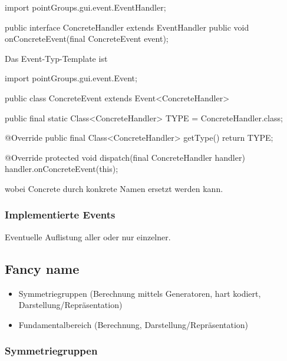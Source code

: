             \begin{code}
                import pointGroups.gui.event.EventHandler;

                public interface ConcreteHandler
                    extends EventHandler
                {
                    public void onConcreteEvent(final ConcreteEvent event);
                }
            \end{code}

            Das Event-Typ-Template ist

            \begin{code}            
                import pointGroups.gui.event.Event;

                public class ConcreteEvent
                    extends Event<ConcreteHandler>
                {
                    public final static Class<ConcreteHandler> TYPE =
                        ConcreteHandler.class;

                    @Override
                    public final Class<ConcreteHandler> getType() {
                        return TYPE;
                    }

                    @Override
                    protected void dispatch(final ConcreteHandler handler) {
                        handler.onConcreteEvent(this);
                    }
                } 
            \end{code}
            
            wobei Concrete durch konkrete Namen ersetzt werden kann.
            
        \subsubsection*{Implementierte Events}
            Eventuelle Auflistung aller oder nur einzelner.
                
\subsection{Fancy name}
    \begin{itemize}
        \item Symmetriegruppen (Berechnung mittels Generatoren, hart kodiert, Darstellung/Repräsentation)
        \item Fundamentalbereich (Berechnung, Darstellung/Repräsentation)
    \end{itemize}
    
    \subsubsection{Symmetriegruppen}
